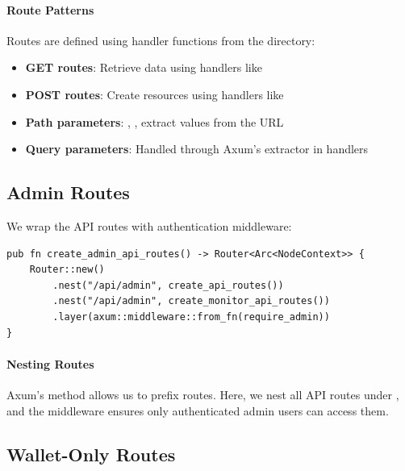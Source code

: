 \paragraph{Route Patterns}
Routes are defined using handler functions from the  directory:

\begin{itemize}
  \item \textbf{GET routes}: Retrieve data using handlers like 
  \item \textbf{POST routes}: Create resources using handlers like 
  \item \textbf{Path parameters}: , ,  extract values from the URL
  \item \textbf{Query parameters}: Handled through Axum's  extractor in handlers
\end{itemize}

\subsection{Admin Routes}

We wrap the API routes with authentication middleware:

\begin{listing}[htbp]
\caption{Admin routes with authentication}
\label{lst:admin-routes}
\begin{verbatim}
pub fn create_admin_api_routes() -> Router<Arc<NodeContext>> {
    Router::new()
        .nest("/api/admin", create_api_routes())
        .nest("/api/admin", create_monitor_api_routes())
        .layer(axum::middleware::from_fn(require_admin))
}
\end{verbatim}
\end{listing}

\paragraph{Nesting Routes}
Axum's  method allows us to prefix routes. Here, we nest all API routes under , and the  middleware ensures only authenticated admin users can access them.

\subsection{Wallet-Only Routes}

